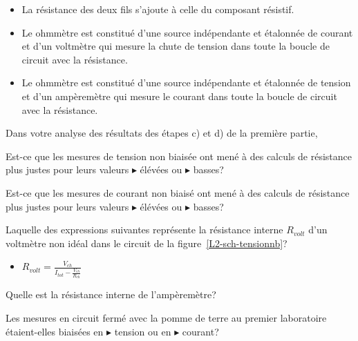 \documentclass[canadien,12pt,oneside,letterpaper]{article}
\begin{document}
\begin{gradescope}
\begin{gradescope}
\begin{itemize}[label=$\blacktriangleright$]
    \item La résistance des deux fils s'ajoute à celle du composant résistif.
    \item Le ohmmètre est constitué d'une source indépendante et étalonnée de courant et d'un voltmètre qui mesure la chute de tension dans toute la boucle de circuit avec la résistance.
    \item Le ohmmètre est constitué d'une source indépendante et étalonnée de tension et d'un ampèremètre qui mesure le courant dans toute la boucle de circuit avec la résistance.  
    \end{itemize}
    \end{gradescope}
\item Dans votre analyse des résultats des étapes c) et d) de la première partie, 
    \begin{gradescope}
    \item Est-ce que les mesures de tension non biaisée ont mené à des calculs de résistance plus justes pour leurs valeurs $\blacktriangleright$ élévées ou $\blacktriangleright$ basses?
    \item Est-ce que les mesures de courant non biaisé ont mené à des calculs de résistance plus justes pour leurs valeurs $\blacktriangleright$ élévées ou $\blacktriangleright$ basses?
    \item Laquelle des expressions suivantes représente la résistance interne $R_{volt}$ d'un voltmètre non idéal dans le circuit de la figure~\ref{L2-sch-tensionnb}?
    \begin{itemize}[label=$\blacktriangleright$]
    \item $R_{volt} = \frac{V_{ch}}{I_{tot}-\frac{V_{ch}}{R_{ch}}}$
    \end{itemize}
    \item Quelle est la résistance interne de l'ampèremètre?
    \end{gradescope}
\item Les mesures en circuit fermé avec la pomme de terre au premier laboratoire étaient-elles biaisées en $\blacktriangleright$ tension ou en $\blacktriangleright$ courant?

\end{gradescope}
\end{document}
